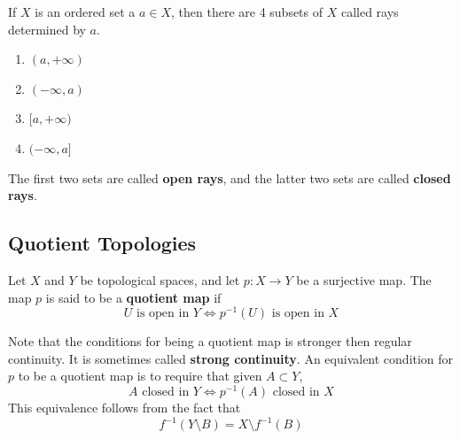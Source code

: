     \begin{definition}
      If $X$ is an ordered set a $a \in X$, then there are 4 subsets of $X$ called rays determined by $a$. 
      \begin{enumerate}
        \item $(a, +\infty)$ 
        \item $(-\infty, a)$
        \item $[a, +\infty)$
        \item $(-\infty, a]$
      \end{enumerate}
      The first two sets are called \textbf{open rays}, and the latter two sets are called \textbf{closed rays}. 
    \end{definition}

  \subsection{Quotient Topologies}

    \begin{definition}
      Let $X$ and $Y$ be topological spaces, and let $p: X \rightarrow Y$ be a surjective map. The map $p$ is said to be a \textbf{quotient map} if
      \begin{equation}
        U \text{ is open in } Y \iff p^{-1}(U) \text{ is open in } X
      \end{equation}
    \end{definition}

    Note that the conditions for being a quotient map is stronger then regular continuity. It is sometimes called \textbf{strong continuity}. An equivalent condition for $p$ to be a quotient map is to require that given $A \subset Y$, 
    \begin{equation}
      A \text{ closed in } Y \iff p^{-1}(A) \text{ closed in } X
    \end{equation}
    This equivalence follows from the fact that
    \begin{equation}
      f^{-1}(Y \setminus B) = X \setminus f^{-1}(B)
    \end{equation}

